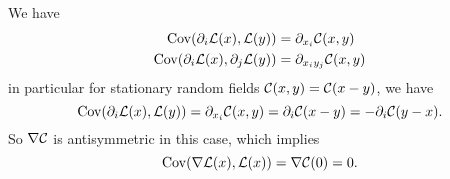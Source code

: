 We have
\begin{align*}
	\operatorname{Cov}(\partial_i\mathcal{L}(x), \mathcal{L}(y)) &= \partial_{x_i} \mathcal{C}(x,y)\\
	\operatorname{Cov}(\partial_i\mathcal{L}(x), \partial_j \mathcal{L}(y)) &= \partial_{x_i y_j} \mathcal{C}(x,y)
\end{align*}
in particular for stationary random fields \(\mathcal{C}(x,y)=\mathcal{C}(x-y)\), we have 
\begin{equation*}
	\operatorname{Cov}(\partial_i\mathcal{L}(x), \mathcal{L}(y))
	= \partial_{x_i} \mathcal{C}(x,y) = \partial_i \mathcal{C}(x-y) = - \partial_i \mathcal{C}(y-x).
\end{equation*}
So \(\nabla \mathcal{C}\) is antisymmetric in this case, which implies 
\begin{equation*}
	\operatorname{Cov}(\nabla\mathcal{L}(x), \mathcal{L}(x)) = \nabla \mathcal{C}(0)=0.
\end{equation*}
